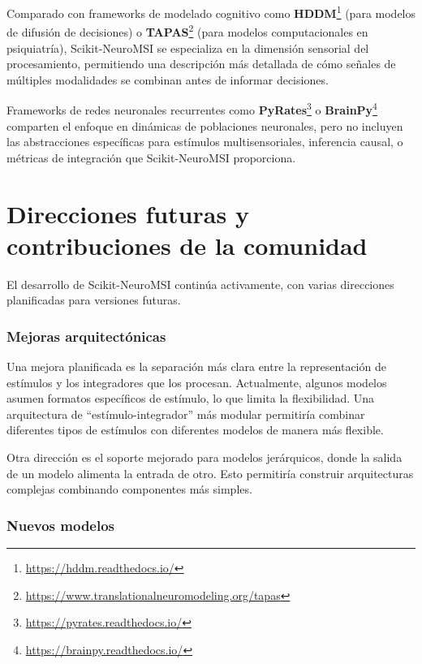 Comparado con frameworks de modelado cognitivo como \textbf{HDDM}\footnote{\url{https://hddm.readthedocs.io/}} (para modelos de difusión de decisiones) o \textbf{TAPAS}\footnote{\url{https://www.translationalneuromodeling.org/tapas}} (para modelos computacionales en psiquiatría), Scikit-NeuroMSI se especializa en la dimensión sensorial del procesamiento, permitiendo una descripción más detallada de cómo señales de múltiples modalidades se combinan antes de informar decisiones.

Frameworks de redes neuronales recurrentes como \textbf{PyRates}\footnote{\url{https://pyrates.readthedocs.io/}} o \textbf{BrainPy}\footnote{\url{https://brainpy.readthedocs.io/}} comparten el enfoque en dinámicas de poblaciones neuronales, pero no incluyen las abstracciones específicas para estímulos multisensoriales, inferencia causal, o métricas de integración que Scikit-NeuroMSI proporciona.


\section{Direcciones futuras y contribuciones de la comunidad}
\label{sec:snmsi_futuro}

El desarrollo de Scikit-NeuroMSI continúa activamente, con varias direcciones planificadas para versiones futuras.

\subsubsection{Mejoras arquitectónicas}
\label{subsec:snmsi_mejoras}

Una mejora planificada es la separación más clara entre la representación de estímulos y los integradores que los procesan. Actualmente, algunos modelos asumen formatos específicos de estímulo, lo que limita la flexibilidad. Una arquitectura de ``estímulo-integrador'' más modular permitiría combinar diferentes tipos de estímulos con diferentes modelos de manera más flexible.

Otra dirección es el soporte mejorado para modelos jerárquicos, donde la salida de un modelo alimenta la entrada de otro. Esto permitiría construir arquitecturas complejas combinando componentes más simples.

\subsubsection{Nuevos modelos}
\label{subsec:snmsi_nuevos_modelos}

